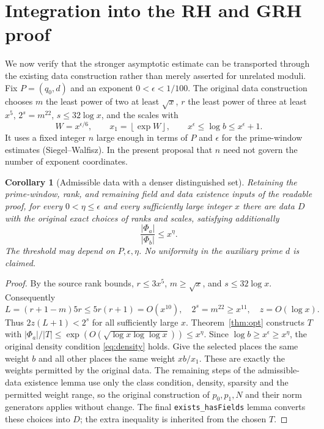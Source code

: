 \documentclass[11pt]{article}
\newtheorem{corollary}[theorem]{Corollary}
\theoremstyle{remark}\newtheorem{remark}[theorem]{Remark}
\newcommand{\floor}[1]{\left\lfloor #1\right\rfloor}
\newcommand{\src}[1]{\texttt{#1}}
\begin{document}
\section{Integration into the RH and GRH proof}\label{sec:integration}
We now verify that the stronger asymptotic estimate can be transported through the existing data construction rather than merely asserted for unrelated moduli. Fix $P=(q_0,d)$ and an exponent $0<\epsilon<1/100$. The original data construction chooses $m$ the least power of two at least $\sqrt{x}$, $r$ the least power of three at least $x^5$, $2^s=m^{22}$, $s\le32\log x$, and the scales with
\[
 W=x^{\epsilon/6},\qquad x_1=\floor{\exp W},\qquad
 x^\epsilon\le\log b\le x^\epsilon+1.
\]
It uses a fixed integer $n$ large enough in terms of $P$ and $\epsilon$ for the prime-window estimates (Siegel--Walfisz). In the present proposal that $n$ need not govern the number of exponent coordinates.

\begin{corollary}[Admissible data with a denser distinguished set]\label{cor:data}
Retaining the prime-window, rank, and remaining field and data existence inputs of the readable proof, for every $0<\eta\le\epsilon$ and every sufficiently large integer $x$ there are data $D$ with the original exact choices of ranks and scales, satisfying additionally
\begin{equation}\label{eq:extra}
 \frac{|\Phi_a|}{|\Phi_b|}\le x^\eta.
\end{equation}
The threshold may depend on $P,\epsilon,\eta$. No uniformity in the auxiliary prime $d$ is claimed.
\end{corollary}
\begin{proof}
By the source rank bounds, $r\le3x^5$, $m\ge\sqrt x$, and $s\le32\log x$. Consequently
\[
 L=(r+1-m)5r\le5r(r+1)=O(x^{10}),\quad
 2^s=m^{22}\ge x^{11},\quad z=O(\log x).
\]
Thus $2z(L+1)<2^s$ for all sufficiently large $x$. Theorem~\ref{thm:opt} constructs $T$ with $|\Phi_a|/|T|\le\exp(O(\sqrt{\log x\log\log x}))\le x^\eta$. Since $\log b\ge x^\epsilon\ge x^\eta$, the original density condition \eqref{eq:density} holds. Give the selected places the same weight $b$ and all other places the same weight $xb/x_1$. These are exactly the weights permitted by the original data. The remaining steps of the admissible-data existence lemma use only the class condition, density, sparsity and the permitted weight range, so the original construction of $p_0,p_1,N$ and their norm generators applies without change. The final \src{exists\_hasFields} lemma converts these choices into $D$; the extra inequality is inherited from the chosen $T$.
\end{proof}
\end{document}
